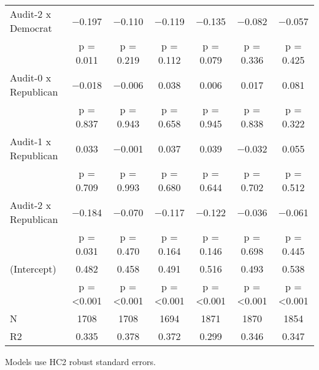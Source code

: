 \begin{table}[!h]
\begin{threeparttable}
{\begin{tabular}[t]{lcccccc}
Audit-2 x Democrat & \num{-0.197} & \num{-0.110} & \num{-0.119} & \num{-0.135} & \num{-0.082} & \num{-0.057}\\
 & p = \num{0.011} & p = \num{0.219} & p = \num{0.112} & p = \num{0.079} & p = \num{0.336} & p = \num{0.425}\\
Audit-0 x Republican & \num{-0.018} & \num{-0.006} & \num{0.038} & \num{0.006} & \num{0.017} & \num{0.081}\\
 & p = \num{0.837} & p = \num{0.943} & p = \num{0.658} & p = \num{0.945} & p = \num{0.838} & p = \num{0.322}\\
Audit-1 x Republican & \num{0.033} & \num{-0.001} & \num{0.037} & \num{0.039} & \num{-0.032} & \num{0.055}\\
 & p = \num{0.709} & p = \num{0.993} & p = \num{0.680} & p = \num{0.644} & p = \num{0.702} & p = \num{0.512}\\
Audit-2 x Republican & \num{-0.184} & \num{-0.070} & \num{-0.117} & \num{-0.122} & \num{-0.036} & \num{-0.061}\\
 & p = \num{0.031} & p = \num{0.470} & p = \num{0.164} & p = \num{0.146} & p = \num{0.698} & p = \num{0.445}\\
(Intercept) & \num{0.482} & \num{0.458} & \num{0.491} & \num{0.516} & \num{0.493} & \num{0.538}\\
 & p = \num{<0.001} & p = \num{<0.001} & p = \num{<0.001} & p = \num{<0.001} & p = \num{<0.001} & p = \num{<0.001}\\
\midrule
N & \num{1708} & \num{1708} & \num{1694} & \num{1871} & \num{1870} & \num{1854}\\
R2 & \num{0.335} & \num{0.378} & \num{0.372} & \num{0.299} & \num{0.346} & \num{0.347}\\
\bottomrule
\end{tabular}}
\begin{tablenotes}
\item Models use HC2 robust standard errors.
\end{tablenotes}
\end{threeparttable}
\end{table}
